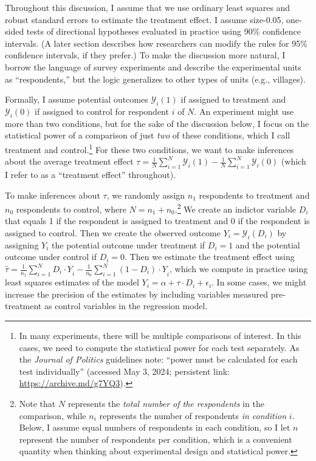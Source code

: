 \documentclass[12pt]{article}
\begin{document}
Throughout this discussion, I assume that we use ordinary least squares and robust standard errors to estimate the treatment effect. 
I assume size-0.05, one-sided tests of directional hypotheses evaluated in practice using 90\% confidence intervals. 
(A later section describes how researchers can modify the rules for 95\% confidence intervals, if they prefer.)
To make the discussion more natural, I borrow the language of survey experiments and describe the experimental units as ``respondents,'' but the logic generalizes to other types of units (e.g., villages). 

Formally, I assume potential outcomes $\mathcal{Y}_{i}(1)$ if assigned to treatment and $\mathcal{Y}_{i}(0)$ if assigned to control for respondent $i$ of $N$. 
An experiment might use more than two conditions, but for the sake of the discussion below, I focus on the statistical power of a comparison of just \emph{two} of these conditions, which I call treatment and control.\footnote{
   In many experiments, there will be multiple comparisons of interest. 
   In this cases, we need to compute the statistical power for each test separately.
   As the \textit{Journal of Politics} guidelines note: ``power must be calculated for each test individually'' (accessed May 3, 2024; persistent link: \url{https://archive.md/g7YQ3}).
  }
For these two conditions, we want to make inferences about the average treatment effect $\tau = \frac{1}{N}\sum_{i = 1}^{N}{\mathcal{Y}_{i}(1)} - \frac{1}{N}\sum_{i = 1}^{N}{\mathcal{Y}_{i}(0)}$ (which I refer to as a ``treatment effect'' throughout).

To make inferences about $\tau$, we randomly assign $n_{1}$ respondents to treatment and $n_{0}$ respondents to control, where $N = n_{1} + n_{0}$.\footnote{
  Note that $N$ represents the \emph{total number of the respondents} in the comparison, while $n_{i}$ represents the number of respondents \emph{in condition} $i$\emph{.}
  Below, I assume equal numbers of respondents in each condition, so I let $n$ represent the number of respondents per condition, which is a convenient quantity when thinking about experimental design and statistical power.
  }
We create an indictor variable $D_{i}$ that equals 1 if the respondent is assigned to treatment and 0 if the respondent is assigned to control. 
Then we create the observed outcome $Y_{i} = \mathcal{Y}_{i}\left( D_{i} \right)$ by assigning $Y_{i}$ the potential outcome under treatment if $D_{i} = 1$ and the potential outcome under control if $D_{i} = 0$. 
Then we estimate the treatment effect using $\widehat{\tau} = \frac{1}{n_{1}}\sum_{i = 1}^{N}{{D_{i} \cdot Y}_{i}} - \frac{1}{n_{0}}\sum_{i = 1}^{N}{{\left( 1 - D_{i} \right) \cdot Y}_{i}}$, which we compute in practice using least squares estimates of the model $Y_{i} = \alpha + \tau \cdot D_{i} + \epsilon_{i}$. 
In some cases, we might increase the precision of the estimates by including variables measured pre-treatment as control variables in the regression model.
\end{document}
